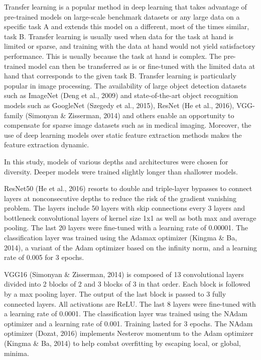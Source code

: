 \documentclass[
]{article}
\begin{document}
Transfer learning is a popular method in deep learning that takes
advantage of pre-trained models on large-scale benchmark datasets or any
large data on a specific task A and extends this model on a different,
most of the times similar, task B. Transfer learning is usually used
when data for the task at hand is limited or sparse, and training with
the data at hand would not yield satisfactory performance. This is
usually because the task at hand is complex. The pre-trained model can
then be transferred as is or fine-tuned with the limited data at hand
that corresponds to the given task B. Transfer learning is particularly
popular in image processing. The availability of large object detection
datasets such as ImageNet (Deng et al., 2009) and state-of-the-art
object recognition models such as GoogleNet (Szegedy et al., 2015),
ResNet (He et al., 2016), VGG-family (Simonyan \& Zisserman, 2014) and
others enable an opportunity to compensate for sparse image datasets
such as in medical imaging. Moreover, the use of deep learning models
over static feature extraction methods makes the feature extraction
dynamic.

In this study, models of various depths and architectures were chosen
for diversity. Deeper models were trained slightly longer than shallower
models.

ResNet50 (He et al., 2016) resorts to double and triple-layer bypasses
to connect layers at nonconsecutive depths to reduce the risk of the
gradient vanishing problem. The layers include 50 layers with skip
connections every 3 layers and bottleneck convolutional layers of kernel
size 1x1 as well as both max and average pooling. The last 20 layers
were fine-tuned with a learning rate of 0.00001. The classification
layer was trained using the Adamax optimizer (Kingma \& Ba, 2014), a
variant of the Adam optimizer based on the infinity norm, and a learning
rate of 0.005 for 3 epochs.

VGG16 (Simonyan \& Zisserman, 2014) is composed of 13 convolutional
layers divided into 2 blocks of 2 and 3 blocks of 3 in that order. Each
block is followed by a max pooling layer. The output of the last block
is passed to 3 fully connected layers. All activations are ReLU. The
last 8 layers were fine-tuned with a learning rate of 0.0001. The
classification layer was trained using the NAdam optimizer and a
learning rate of 0.001. Training lasted for 3 epochs. The NAdam
optimizer (Dozat, 2016) implements Nesterov momentum to the Adam
optimizer (Kingma \& Ba, 2014) to help combat overfitting by escaping
local, or global, minima.
\end{document}
